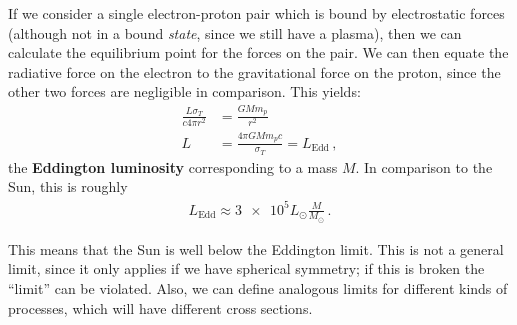 \documentclass[main.tex]{subfiles}
\begin{document}
If we consider a single electron-proton pair which is bound by electrostatic forces (although not in a bound \emph{state}, since we still have a plasma), then we can calculate the equilibrium point for the forces on the pair. 
We can then equate the radiative force on the electron to the gravitational force on the proton, since the other two forces are negligible in comparison. This yields: 
%
\begin{align}
\frac{L \sigma_{T}}{c 4 \pi r^2} &= \frac{G M m_p}{r^2}  \\
L &= \frac{4 \pi G M m_p c}{\sigma_{T}} = L _{\text{Edd}}
\,,
\end{align}
%
the \textbf{Eddington luminosity} corresponding to a mass \(M\). 
In comparison to the Sun, this is roughly 
%
\begin{align}
L _{\text{Edd}} \approx \num{3e5} L_{\odot} \frac{M}{M_{\odot}}
\,.
\end{align}

This means that the Sun is well below the Eddington limit. 
This is not a general limit, since it only applies if we have spherical symmetry; if this is broken the ``limit'' can be violated. 
Also, we can define analogous limits for different kinds of processes, which will have different cross sections. 
\end{document}
